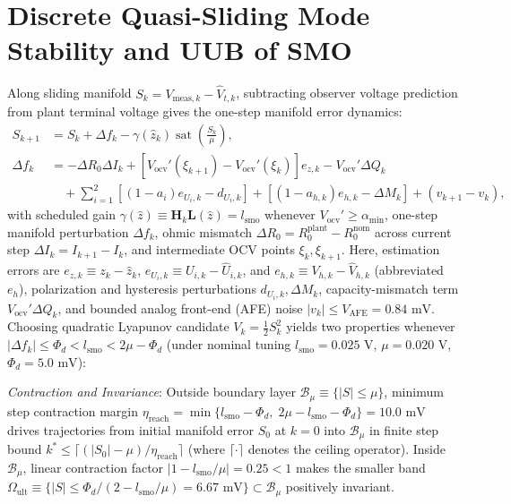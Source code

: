 \documentclass[10pt,a4paper]{article}
\begin{document}
\section{Discrete Quasi-Sliding Mode Stability and UUB of SMO\label{app:lyapunov}}
Along sliding manifold $S_k = V_{\text{meas},k} - \hat{V}_{t,k}$, subtracting observer voltage prediction from plant terminal voltage gives the one-step manifold error dynamics:
\begin{align*}
S_{k+1} &= S_k + \Delta f_k - \gamma(\hat{z}_k)\operatorname{sat}\!\left(\frac{S_k}{\mu}\right), \\
\Delta f_k &= -\Delta R_0 \Delta I_k + \left[V_{\text{ocv}}'(\xi_{k+1}) - V_{\text{ocv}}'(\xi_k)\right] e_{z,k} - V_{\text{ocv}}'\Delta Q_k \\
&\quad + \sum_{i=1}^2 \left[(1-a_i)e_{U_i,k} - d_{U_i,k}\right] + \left[(1-a_{h,k})e_{h,k} - \Delta M_k\right] + (v_{k+1} - v_k),
\end{align*}
with scheduled gain $\gamma(\hat{z}) \equiv \mathbf{H}_k\mathbf{L}(\hat{z}) = l_{\text{smo}}$ whenever $V_{\text{ocv}}' \ge \alpha_{\min}$, one-step manifold perturbation $\Delta f_k$, ohmic mismatch $\Delta R_0 = R_0^{\text{plant}} - R_0^{\text{nom}}$ across current step $\Delta I_k = I_{k+1} - I_k$, and intermediate OCV points $\xi_k, \xi_{k+1}$. Here, estimation errors are $e_{z,k} \equiv z_k - \hat{z}_k$, $e_{U_i,k} \equiv U_{i,k} - \hat{U}_{i,k}$, and $e_{h,k} \equiv V_{h,k} - \hat{V}_{h,k}$ (abbreviated $e_h$), polarization and hysteresis perturbations $d_{U_i,k}, \Delta M_k$, capacity-mismatch term $V_{\text{ocv}}'\Delta Q_k$, and bounded analog front-end (AFE) noise $|v_k| \le V_{\text{AFE}} = 0.84\text{ mV}$. Choosing quadratic Lyapunov candidate $V_k = \tfrac{1}{2}S_k^2$ yields two properties whenever $|\Delta f_k| \le \Phi_d < l_{\text{smo}} < 2\mu - \Phi_d$ (under nominal tuning $l_{\text{smo}} = 0.025\text{ V}$, $\mu = 0.020\text{ V}$, $\Phi_d = 5.0\text{ mV}$):

\emph{Contraction and Invariance}: Outside boundary layer $\mathcal{B}_\mu \equiv \{|S| \le \mu\}$, minimum step contraction margin $\eta_{\text{reach}} = \min\{l_{\text{smo}} - \Phi_d,\; 2\mu - l_{\text{smo}} - \Phi_d\} = 10.0\text{ mV}$ drives trajectories from initial manifold error $S_0$ at $k=0$ into $\mathcal{B}_\mu$ in finite step bound $k^* \le \lceil (|S_0| - \mu)/\eta_{\text{reach}} \rceil$ (where $\lceil \cdot \rceil$ denotes the ceiling operator). Inside $\mathcal{B}_\mu$, linear contraction factor $|1 - l_{\text{smo}}/\mu| = 0.25 < 1$ makes the smaller band $\Omega_{\text{ult}} \equiv \{|S| \le \Phi_d/(2 - l_{\text{smo}}/\mu) = 6.67\text{ mV}\} \subset \mathcal{B}_\mu$ positively invariant.
\end{document}
